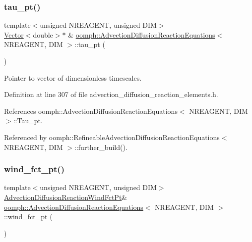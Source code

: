 \subsubsection{\texorpdfstring{tau\+\_\+pt()}{tau\_pt()}}
{\footnotesize\ttfamily template$<$unsigned N\+R\+E\+A\+G\+E\+NT, unsigned D\+IM$>$ \\
\hyperlink{classoomph_1_1Vector}{Vector}$<$double$>$$\ast$ \& \hyperlink{classoomph_1_1AdvectionDiffusionReactionEquations}{oomph\+::\+Advection\+Diffusion\+Reaction\+Equations}$<$ N\+R\+E\+A\+G\+E\+NT, D\+IM $>$\+::tau\+\_\+pt (\begin{DoxyParamCaption}{ }\end{DoxyParamCaption})\hspace{0.3cm}{\ttfamily [inline]}}



Pointer to vector of dimensionless timescales. 



Definition at line 307 of file advection\+\_\+diffusion\+\_\+reaction\+\_\+elements.\+h.



References oomph\+::\+Advection\+Diffusion\+Reaction\+Equations$<$ N\+R\+E\+A\+G\+E\+N\+T, D\+I\+M $>$\+::\+Tau\+\_\+pt.



Referenced by oomph\+::\+Refineable\+Advection\+Diffusion\+Reaction\+Equations$<$ N\+R\+E\+A\+G\+E\+N\+T, D\+I\+M $>$\+::further\+\_\+build().

\mbox{\label{classoomph_1_1AdvectionDiffusionReactionEquations_a68cbfaf5625359cee3b97d82929feaf9}} 
\subsubsection{\texorpdfstring{wind\+\_\+fct\+\_\+pt()}{wind\_fct\_pt()}\hspace{0.1cm}{\footnotesize\ttfamily [1/2]}}
{\footnotesize\ttfamily template$<$unsigned N\+R\+E\+A\+G\+E\+NT, unsigned D\+IM$>$ \\
\hyperlink{classoomph_1_1AdvectionDiffusionReactionEquations_a2fff621b5b44c64bd5b3f0412201055f}{Advection\+Diffusion\+Reaction\+Wind\+Fct\+Pt}\& \hyperlink{classoomph_1_1AdvectionDiffusionReactionEquations}{oomph\+::\+Advection\+Diffusion\+Reaction\+Equations}$<$ N\+R\+E\+A\+G\+E\+NT, D\+IM $>$\+::wind\+\_\+fct\+\_\+pt (\begin{DoxyParamCaption}{ }\end{DoxyParamCaption})\hspace{0.3cm}{\ttfamily [inline]}}



